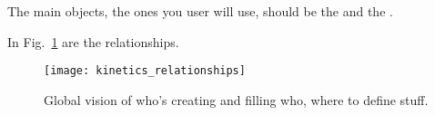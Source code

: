 The main objects, the ones you user will use, should be the
 and the .

In Fig.~\ref{kinpf} are the relationships.
\begin{figure}
\centering
\texttt{[image: kinetics\_relationships]}
\caption{\label{kinpf}Global vision of who's creating and filling
who, where to define stuff.}
\end{figure}
